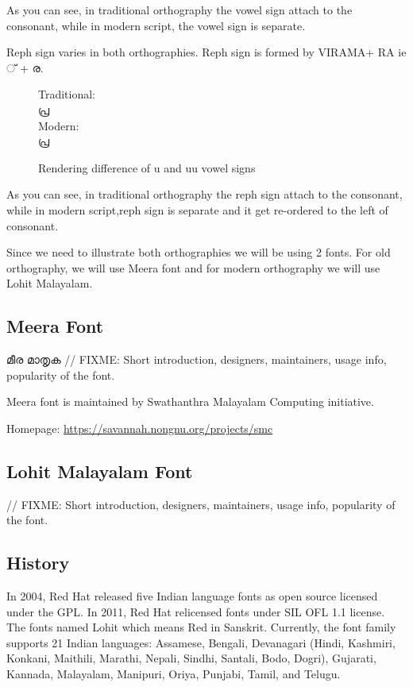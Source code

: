 As you can see, in traditional orthography the vowel sign attach to the consonant, while in modern script, the vowel sign is separate.

Reph sign varies in both orthographies. Reph sign is formed by VIRAMA+ RA ie {\malayalam ് + ര}.
\begin{figure}[h]
Traditional:\\ {\meera\textexample  പ്ര }\\
Modern: \\ {\lohitmalayalam\textexample  പ്ര }
   \caption{Rendering difference of u and uu vowel signs}
\end{figure}

As you can see, in traditional orthography the reph sign attach to the consonant, while in modern script,reph sign is separate and it get re-ordered to the left of consonant.



Since we need to illustrate both orthographies we will be using 2
fonts. For old orthography, we will use Meera font and for modern
orthography we will use Lohit Malayalam.

\subsection {Meera Font}
{\meera മീര മാതൃക }
// FIXME: Short introduction, designers, maintainers, usage info, popularity of the font.

Meera font is maintained by Swathanthra Malayalam Computing initiative.

Homepage: {\url{https://savannah.nongnu.org/projects/smc}}

\subsection {Lohit Malayalam Font}
// FIXME: Short introduction, designers, maintainers, usage info, popularity of the font.

\subsection {History}
In 2004, Red Hat released five Indian language fonts as open source licensed
under the GPL. In 2011, Red Hat relicensed fonts under SIL OFL 1.1 license.
The fonts named Lohit which means Red in Sanskrit. Currently, the font family
supports 21 Indian languages: Assamese, Bengali, Devanagari (Hindi, Kashmiri,
Konkani, Maithili, Marathi, Nepali, Sindhi, Santali, Bodo, Dogri), Gujarati,
Kannada, Malayalam, Manipuri, Oriya, Punjabi, Tamil, and Telugu.

